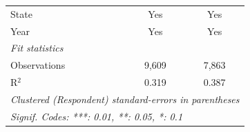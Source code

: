 \begin{tabular}{lcc}
   State                          & Yes            & Yes\\  
   Year                           & Yes            & Yes\\  
   \midrule
   \emph{Fit statistics}\\
   Observations                   & 9,609          & 7,863\\  
   R$^2$                          & 0.319          & 0.387\\  
   \midrule \midrule
   \multicolumn{3}{l}{\emph{Clustered (Respondent) standard-errors in parentheses}}\\
   \multicolumn{3}{l}{\emph{Signif. Codes: ***: 0.01, **: 0.05, *: 0.1}}\\
\end{tabular}
\par\endgroup



